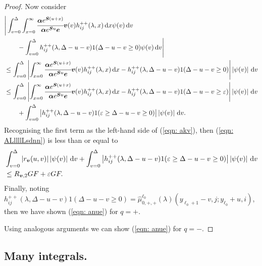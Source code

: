 \begin{proof}
                Now consider 
                \begin{align}
                	&\Bigg|\int_{v=0}^\Delta \int_{x=0}^\infty \cfrac{\boldsymbol \alpha e^{\boldsymbol{S}(u+x)} }{\boldsymbol \alpha e^{\boldsymbol{S}u} \boldsymbol e} {\boldsymbol v}(v)h_{ij}^{++} (\lambda,x)\, \mathrm{d} x \psi(v)\, \mathrm{d} v  \nonumber 
		\\&\qquad{}- \int_{v=0}^\Delta h_{ij}^{++}(\lambda,\Delta-u-v) 1(\Delta-u-v\geq 0) \psi(v)\, \mathrm{d} v\Bigg| \nonumber 
                	\\&\leq \int_{v=0}^\Delta \left|  \int_{x=0}^\infty \cfrac{\boldsymbol \alpha e^{\boldsymbol{S}(u+x)} }{\boldsymbol \alpha e^{\boldsymbol{S}u} \boldsymbol e} {\boldsymbol v}(v)h_{ij}^{++} (\lambda,x)\, \mathrm{d} x  - h_{ij}^{++}(\lambda,\Delta-u-v) 1(\Delta-u-v\geq 0) \right| \left| \psi(v) \right| \, \mathrm{d} v\nonumber 
                	\\&\leq \int_{v=0}^\Delta \left|  \int_{x=0}^\infty \cfrac{\boldsymbol \alpha e^{\boldsymbol{S}(u+x)} }{\boldsymbol \alpha e^{\boldsymbol{S}u} \boldsymbol e} {\boldsymbol v}(v)h_{ij}^{++} (\lambda,x)\, \mathrm{d} x  - h_{ij}^{++}(\lambda,\Delta-u-v) 1(\Delta-u-v\geq \varepsilon) \right| \left| \psi(v) \right| \, \mathrm{d} v\nonumber 
                	\\&\qquad {}+ \int_{v=0}^\Delta \left| h_{ij}^{++}(\lambda,\Delta-u-v) 1(\varepsilon \geq \Delta-u-v\geq 0) \right| \left| \psi(v) \right| \, \mathrm{d} v. \label{eqn: ALllllLsdnn}
                \end{align}
                Recognising the first term as the left-hand side of (\ref{eqn: akv}), then (\ref{eqn: ALllllLsdnn}) is less than or equal to 
                \begin{align}
                	& \int_{v=0}^\Delta |r_{\boldsymbol v}(u,v)| \left| \psi(v) \right| \, \mathrm{d} v 
                	+ \int_{v=0}^\Delta \left| h_{ij}^{++}(\lambda,\Delta-u-v) 1(\varepsilon \geq \Delta-u-v\geq 0) \right| \left| \psi(v) \right| \, \mathrm{d} v\nonumber 
                	\\&\leq R_{{\boldsymbol v},2} GF + \varepsilon GF. \nonumber 
                \end{align}
                Finally, noting \(h_{ij}^{++}(\lambda,\Delta-u-v) 1(\Delta-u-v\geq 0)=\widehat \mu_{0,+,+}^{\ell_0}(\lambda)(y_{\ell_0+1}-v,j;y_{\ell_0}+u,i)\), then we have shown (\ref{eqn: anue}) for \(q=+\). 
                
                Using analogous arguments we can show  (\ref{eqn: anue}) for \(q=-\).
\end{proof}


\subsection{Many integrals.}

